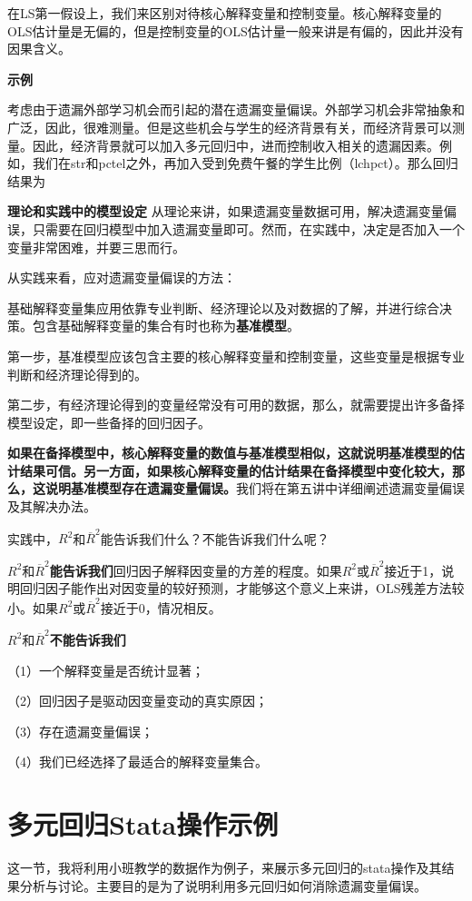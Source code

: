\documentclass[cn,12pt,math=newtx,citestyle=gb7714-2015,bibstyle=gb7714-2015]{elegantbook}
\begin{document}
	在LS第一假设上，我们来区别对待核心解释变量和控制变量。核心解释变量的OLS估计量是无偏的，但是控制变量的OLS估计量一般来讲是有偏的，因此并没有因果含义。
	
	\textbf{示例}
	
	考虑由于遗漏外部学习机会而引起的潜在遗漏变量偏误。外部学习机会非常抽象和广泛，因此，很难测量。但是这些机会与学生的经济背景有关，而经济背景可以测量。因此，经济背景就可以加入多元回归中，进而控制收入相关的遗漏因素。例如，我们在str和pctel之外，再加入受到免费午餐的学生比例（lchpct）。那么回归结果为
	
	\textbf{理论和实践中的模型设定}
	从理论来讲，如果遗漏变量数据可用，解决遗漏变量偏误，只需要在回归模型中加入遗漏变量即可。然而，在实践中，决定是否加入一个变量非常困难，并要三思而行。
	
	从实践来看，应对遗漏变量偏误的方法：
	
	基础解释变量集应用依靠专业判断、经济理论以及对数据的了解，并进行综合决策。包含基础解释变量的集合有时也称为\textbf{基准模型}。
	
	第一步，基准模型应该包含主要的核心解释变量和控制变量，这些变量是根据专业判断和经济理论得到的。
	
	第二步，有经济理论得到的变量经常没有可用的数据，那么，就需要提出许多备择模型设定，即一些备择的回归因子。
	
	\textbf{如果在备择模型中，核心解释变量的数值与基准模型相似，这就说明基准模型的估计结果可信。另一方面，如果核心解释变量的估计结果在备择模型中变化较大，那么，这说明基准模型存在遗漏变量偏误。}我们将在第五讲中详细阐述遗漏变量偏误及其解决办法。
	
	实践中，$R^2$和$\overline{R}^2$能告诉我们什么？不能告诉我们什么呢？
	
	$R^2$和$\overline{R}^2$\textbf{能告诉我们}回归因子解释因变量的方差的程度。如果$R^2$或$\overline{R}^2$接近于1，说明回归因子能作出对因变量的较好预测，才能够这个意义上来讲，OLS残差方法较小。如果$R^2$或$\overline{R}^2$接近于0，情况相反。
	
	$R^2$和$\overline{R}^2$\textbf{不能告诉我们}
	
	（1）一个解释变量是否统计显著；
	
	（2）回归因子是驱动因变量变动的真实原因；
	
	（3）存在遗漏变量偏误；
	
	（4）我们已经选择了最适合的解释变量集合。
	
	\section{多元回归Stata操作示例}
	这一节，我将利用小班教学的数据作为例子，来展示多元回归的stata操作及其结果分析与讨论。主要目的是为了说明利用多元回归如何消除遗漏变量偏误。
	
\end{document}
